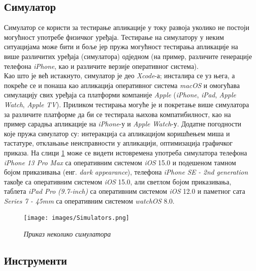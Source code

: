 \documentclass[12pt,oneside]{memoir}
\begin{document}
\subsection{Симулатор}
\indent Симулатор се користи за тестирање апликације у току развоја уколико не постоји могућност употребе физичког уређаја. Тестирање на симулатору у неким ситуацијама може бити и боље јер пружа могућност тестирања апликације на више различитих уређаја (симулатора) одједном (на пример, различите генерације телефона \textit{iPhone}, као и различите верзије оперативног система). 
\\
\indent Као што је већ истакнуто, симулатор је део \textit{Xcode}-а; инсталира се уз њега, а покреће се и понаша као апликација оперативног система \textit{macOS} и омогућава симулацију свих уређаја са платформи компаније \textit{Apple} (\textit{iPhone}, \textit{iPad}, \textit{Apple Watch}, \textit{Apple TV}). Приликом тестирања могуће је и покретање више симулатора за различите платформе да би се тестирала њихова компатибилност, као на пример сарадња апликације на \textit{iPhone}-у и \textit{Apple Watch}-у. 
Додатне погодности које пружа симулатор су: интеракција са апликацијом коришћењем миша и тастатуре, отклањање неисправности у апликацији, оптимизација графичког приказа. На слици \ref{slika:simulatori} може се видети истовремена употреба симулатора телефона \textit{iPhone 13 Pro Max} са оперативним системом \textit{iOS} 15.0 и подешеном тамном бојом приказивања (енг. \textit{dark appearance}), телефона \textit{iPhone SE - 2nd generation} такође са оперативним системом \textit{iOS} 15.0, али светлом бојом приказивања, таблета \textit{iPad Pro (9.7-inch)} са оперативним системом \textit{iOS} 12.0 и паметног сата \textit{Series 7 - 45mm} са оперативним системом \textit{watchOS} 8.0.

\begin{figure}[H]
\texttt{[image: images/Simulators.png]}
\centering
\caption{\textit{Приказ неколико симулатора}}
\label{slika:simulatori}
\end{figure}

\subsection{Инструменти}
\end{document}
